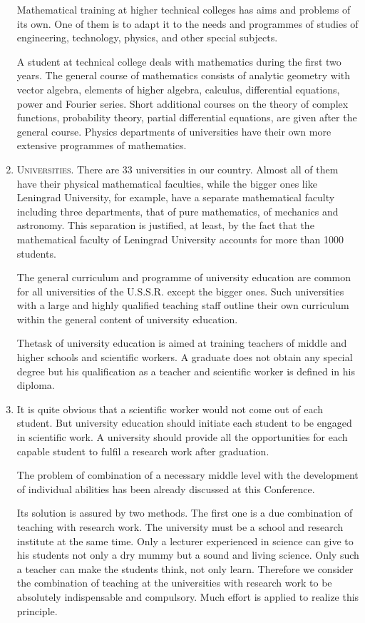 \begin{enumerate}
Mathematical training at higher technical colleges has aims and problems of its own. One of them is to adapt it to the needs and programmes of studies of engineering, technology, physics, and other special subjects.

A student at technical college deals with mathematics during the first two years. The general course of mathematics consists of analytic geometry with vector algebra, elements of higher algebra, calculus, differential equations, power and Fourier series. Short additional courses on the theory of complex functions, probability theory, partial differential equations, are given after the general course. Physics departments of universities have their own more extensive programmes of mathematics.

\item \textsc{Universities}. There are 33 universities in our country. Almost all of them have their physical mathematical faculties, while the bigger ones like Leningrad University, for example, have a separate mathematical faculty including three departments, that of pure mathematics, of mechanics and astronomy. This separation is justified, at least, by the fact that the mathematical faculty of Leningrad University accounts for more than 1000 students.

The general curriculum and programme of university education are common for all universities of the U.S.S.R. except the bigger ones. Such universities with a large and highly qualified teaching staff outline their own curriculum within the general content of university education.

The\pageoriginale task of university education is aimed at training teachers of middle and higher schools and scientific workers. A graduate does not obtain any special degree but his qualification as a teacher and scientific worker is defined in his diploma.

\item It is quite obvious that a scientific worker would not come out of each student. But university education should initiate each student to be engaged in scientific work. A university should provide all the opportunities for each capable student to fulfil a research work after graduation. 

The problem of combination of a necessary middle level with the development of individual abilities has been already discussed at this Conference.

Its solution is assured by two methods. The first one is a due combination of teaching with research work. The university must be a school and research institute at the same time. Only a lecturer experienced in science can give to his students not only a dry mummy but a sound and living science. Only such a teacher can make the students think, not only learn. Therefore we consider the combination of teaching at the universities with research work to be absolutely indispensable and compulsory. Much effort is applied to realize this principle.


\end{enumerate}
